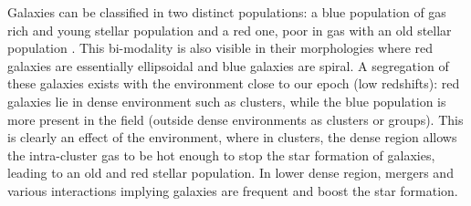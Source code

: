 Galaxies can be classified in two distinct populations: a blue population of
gas rich and young stellar population and a red one, poor in gas with an old
stellar population \citep{Driver+06}. This bi-modality is also visible in their
morphologies where red galaxies are essentially ellipsoidal and blue galaxies
are spiral. A segregation of these galaxies exists with the environment close
to our epoch (low redshifts): red galaxies lie in dense environment such as
clusters, while the blue population is more present in the field (outside dense
environments as clusters or groups). This is clearly an effect of the
environment, where in clusters, the dense region allows the intra-cluster gas
to be hot enough to stop the star formation of galaxies, leading to an old and
red stellar population. In lower dense region, mergers and various interactions
implying galaxies are frequent and boost the star formation.

